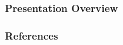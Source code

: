 \documentclass[
	11pt, %
	aspectratio=169, %
]{beamer}
\begin{document}

\begin{frame}
	\titlepage %
\end{frame}



\begin{frame}
	\frametitle{Presentation Overview} %
	
	\tableofcontents %
\end{frame}






\begin{frame}[allowframebreaks]%
	\frametitle{References}
\printbibliography
\end{frame}
\end{document}

